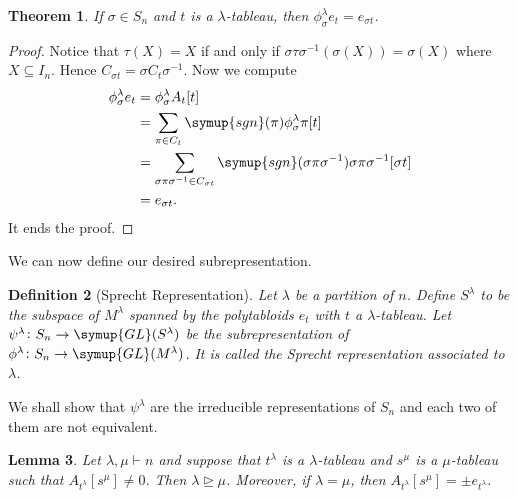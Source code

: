 \documentclass{assignment}[2019/10/15]
\theoremstyle{plain}
\newtheorem{theorem}{Theorem}[section]
\newtheorem{definition}[theorem]{Definition}
\newtheorem{lemma}[theorem]{Lemma}
\newcommand{\GL}{\mathop{}\!\symup{GL}}
\newcommand{\sgn}{\mathop{}\!\symup{sgn}}
\begin{document}
    \begin{theorem}\label{thm: poly-commu}
        If $\sigma\in S_n$ and $t$ is a $\lambda$-tableau, then $\phi_\sigma^\lambda e_t = e_{\sigma t}$.
    \end{theorem}

    \begin{proof}
        Notice that $\tau(X) = X$ if and only if $\sigma\tau\sigma^{-1}(\sigma(X)) = \sigma(X)$ where $X\subseteq I_n$. Hence $C_{\sigma t}=\sigma C_t\sigma^{-1}$. Now we compute
        \begin{equation}
            \begin{aligned}
                \phi_\sigma^\lambda e_t &= \phi_\sigma^\lambda A_t[t]\\
                &= \sum_{\pi\in C_t}\sgn(\pi)\phi_\sigma^\lambda \pi [t]\\
                &= \sum_{\sigma\pi\sigma^{-1}\in C_{\sigma t}}\sgn(\sigma\pi\sigma^{-1})\sigma\pi\sigma^{-1}[\sigma t]\\
                &= e_{\sigma t}.
            \end{aligned}
        \end{equation}
        It ends the proof.
    \end{proof}

    We can now define our desired subrepresentation.
    \begin{definition}[Sprecht Representation]
        Let $\lambda$ be a partition of $n$. Define $S^\lambda$ to be the subspace of $M^\lambda$ spanned by the polytabloids $e_t$ with $t$ a $\lambda$-tableau. Let $\psi^\lambda\colon S_n\to \GL(S^\lambda)$ be the subrepresentation of $\phi^\lambda\colon S_n\to \GL(M^\lambda)$. It is called the \emph{Sprecht representation} associated to $\lambda$.
    \end{definition}

    We shall show that $\psi^\lambda$ are the irreducible representations of $S_n$ and each two of them are not equivalent.

    \begin{lemma}\label{lem: Ats}
        Let $\lambda, \mu\vdash n$ and suppose that $t^\lambda$ is a $\lambda$-tableau and $s^\mu$ is a $\mu$-tableau such that $A_{t^\lambda}[s^\mu]\neq 0$. Then $\lambda\unrhd\mu$. Moreover, if $\lambda=\mu$, then $A_{t^\lambda}[s^\mu]=\pm e_{t^\lambda}$.
    \end{lemma}
\end{document}

